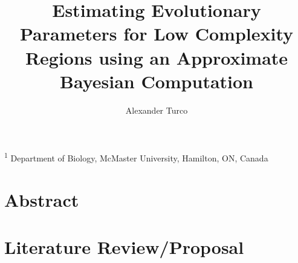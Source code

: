 \documentclass{article}
\title{\sc Estimating Evolutionary Parameters for Low Complexity Regions using an Approximate Bayesian Computation}
\author{\sc Alexander Turco}
\begin{document}

\onecolumn
                        \maketitle

\thispagestyle{empty}
\noindent \textsuperscript{1} Department of Biology, McMaster University, Hamilton, ON, Canada

\newpage
\tableofcontents
\newpage
       
\section{Abstract} 

\bigskip
                        
                        
                        
\newpage
%

\section{Literature Review/Proposal}
\end{document}
